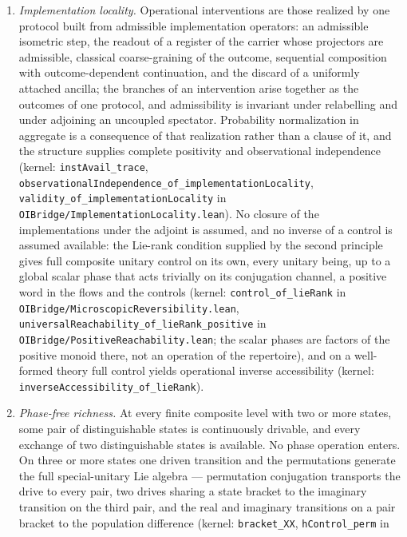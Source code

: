 \documentclass[
]{article}
\begin{document}
\begin{enumerate}
\def\labelenumi{\arabic{enumi}.}
\item
  \emph{Implementation locality.} Operational interventions are those
  realized by one protocol built from admissible implementation
  operators: an admissible isometric step, the readout of a register of
  the carrier whose projectors are admissible, classical coarse-graining
  of the outcome, sequential composition with outcome-dependent
  continuation, and the discard of a uniformly attached ancilla; the
  branches of an intervention arise together as the outcomes of one
  protocol, and admissibility is invariant under relabelling and under
  adjoining an uncoupled spectator. Probability normalization in
  aggregate is a consequence of that realization rather than a clause of
  it, and the structure supplies complete positivity and observational
  independence (kernel: \texttt{instAvail\_trace},
  \texttt{observationalIndependence\_of\_implementationLocality},
  \texttt{validity\_of\_implementationLocality} in
  \texttt{OIBridge/ImplementationLocality.lean}). No closure of the
  implementations under the adjoint is assumed, and no inverse of a
  control is assumed available: the Lie-rank condition supplied by the
  second principle gives full composite unitary control on its own,
  every unitary being, up to a global scalar phase that acts trivially
  on its conjugation channel, a positive word in the flows and the
  controls (kernel: \texttt{control\_of\_lieRank} in
  \texttt{OIBridge/MicroscopicReversibility.lean},
  \texttt{universalReachability\_of\_lieRank\_positive} in
  \texttt{OIBridge/PositiveReachability.lean}; the scalar phases are
  factors of the positive monoid there, not an operation of the
  repertoire), and on a well-formed theory full control yields
  operational inverse accessibility (kernel:
  \texttt{inverseAccessibility\_of\_lieRank}).
\item
  \emph{Phase-free richness.} At every finite composite level with two
  or more states, some pair of distinguishable states is continuously
  drivable, and every exchange of two distinguishable states is
  available. No phase operation enters. On three or more states one
  driven transition and the permutations generate the full
  special-unitary Lie algebra --- permutation conjugation transports the
  drive to every pair, two drives sharing a state bracket to the
  imaginary transition on the third pair, and the real and imaginary
  transitions on a pair bracket to the population difference (kernel:
  \texttt{bracket\_XX}, \texttt{hControl\_perm} in

\end{enumerate}
\end{document}
